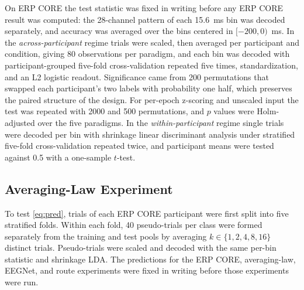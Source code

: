 On ERP CORE the test statistic was fixed in writing before any ERP CORE result was computed: the 28-channel pattern of each 15.6~ms bin was decoded separately, and accuracy was averaged over the bins centered in $[-200,0)$~ms. In the \emph{across-participant} regime trials were scaled, then averaged per participant and condition, giving 80 observations per paradigm, and each bin was decoded with participant-grouped five-fold cross-validation repeated five times, standardization, and an L2 logistic readout. Significance came from 200 permutations that swapped each participant's two labels with probability one half, which preserves the paired structure of the design. For per-epoch z-scoring and unscaled input the test was repeated with 2000 and 500 permutations, and $p$ values were Holm-adjusted over the five paradigms. In the \emph{within-participant} regime single trials were decoded per bin with shrinkage linear discriminant analysis under stratified five-fold cross-validation repeated twice, and participant means were tested against 0.5 with a one-sample $t$-test.

\subsection{Averaging-Law Experiment}
To test \eqref{eq:pred}, trials of each ERP CORE participant were first split into five stratified folds. Within each fold, 40 pseudo-trials per class were formed separately from the training and test pools by averaging $k\in\{1,2,4,8,16\}$ distinct trials. Pseudo-trials were scaled and decoded with the same per-bin statistic and shrinkage LDA. The predictions for the ERP CORE, averaging-law, EEGNet, and route experiments were fixed in writing before those experiments were run.
